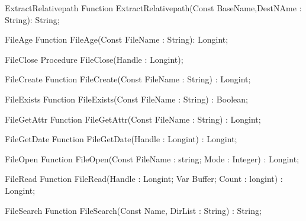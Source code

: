  
\begin{function}{ExtractRelativepath}
\Declaration
Function ExtractRelativepath(Const BaseName,DestNAme : String): String;
\Description
\Errors
\SeeAlso
\end{function}

 
\begin{function}{FileAge}
\Declaration
Function FileAge(Const FileName : String): Longint;
\Description
\Errors
\SeeAlso
\end{function}

 
\begin{procedure}{FileClose}
\Declaration
Procedure FileClose(Handle : Longint);
\Description
\Errors
\SeeAlso
\end{procedure}

 
\begin{function}{FileCreate}
\Declaration
Function FileCreate(Const FileName : String) : Longint;
\Description
\Errors
\SeeAlso
\end{function}

 
\begin{function}{FileExists}
\Declaration
Function FileExists(Const FileName : String) : Boolean;
\Description
\Errors
\SeeAlso
\end{function}

 
\begin{function}{FileGetAttr}
\Declaration
Function FileGetAttr(Const FileName : String) : Longint;
\Description
\Errors
\SeeAlso
\end{function}

 
\begin{function}{FileGetDate}
\Declaration
Function FileGetDate(Handle : Longint) : Longint;
\Description
\Errors
\SeeAlso
\end{function}

 
\begin{function}{FileOpen}
\Declaration
Function FileOpen(Const FileName : string; Mode : Integer) : Longint;
\Description
\Errors
\SeeAlso
\end{function}

 
\begin{function}{FileRead}
\Declaration
Function FileRead(Handle : Longint; Var Buffer; Count : longint) : Longint;
\Description
\Errors
\SeeAlso
\end{function}

 
\begin{function}{FileSearch}
\Declaration
Function FileSearch(Const Name, DirList : String) : String;
\Description
\Errors
\SeeAlso
\end{function}

